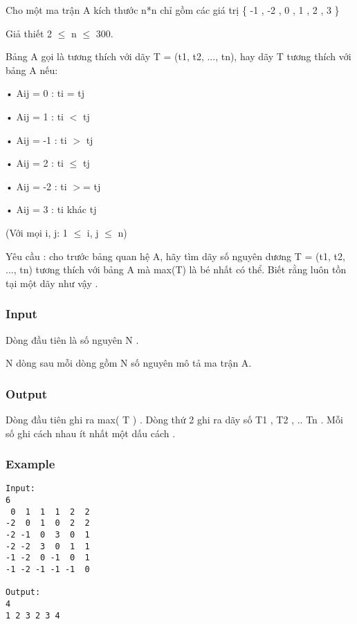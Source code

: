 



   Cho một ma trận A kích thước n*n chỉ gồm các giá trị \{ -1 , -2 , 0 , 1 , 2 , 3 \}   


   Giả thiết 2  $\le$  n  $\le$  300.   


   Bảng A gọi là tương thích với dãy T = (t1, t2, ..., tn), hay dãy T tương thích với bảng A nếu:   


   • Aij = 0  :   ti = tj   


   • Aij = 1  :   ti $<$ tj   


   • Aij = -1 :   ti $>$ tj   


   • Aij = 2  :  ti  $\le$  tj   


   • Aij = -2 :   ti $>$= tj   


   • Aij = 3  :   ti khác tj   


   (Với mọi i, j: 1  $\le$  i, j  $\le$  n)   


   Yêu cầu : cho trước bảng quan hệ A, hãy tìm dãy số nguyên dương T = (t1, t2, ..., tn) tương thích với bảng A mà max(T) là bé nhất có thể. Biết rằng luôn tồn tại một dãy như vậy .  

\subsubsection{   Input  }

   Dòng đầu tiên là số nguyên N .   


   N dòng sau mỗi dòng gồm N số nguyên mô tả ma trận A.  

\subsubsection{   Output  }

   Dòng đầu tiên ghi ra max( T ) . Dòng thứ 2 ghi ra dãy số T1 , T2 , .. Tn . Mỗi số ghi cách nhau ít nhất một dấu cách .  

\subsubsection{   Example  }
\begin{verbatim}
Input:
6
 0  1  1  1  2  2
-2  0  1  0  2  2
-2 -1  0  3  0  1
-2 -2  3  0  1  1
-1 -2  0 -1  0  1
-1 -2 -1 -1 -1  0

Output:
4
1 2 3 2 3 4 
\end{verbatim}
